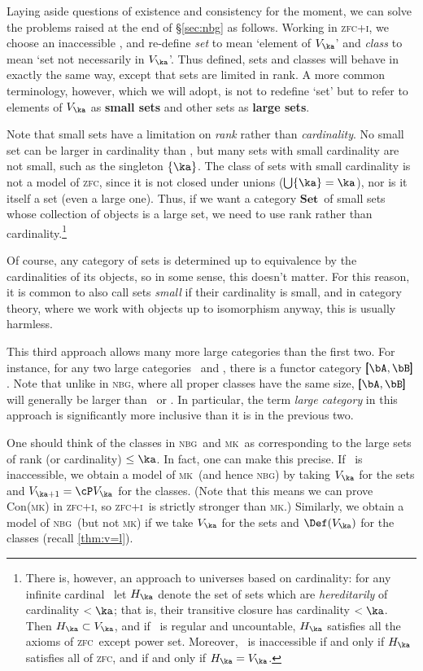 \documentclass[12pt]{amsart}
\newcommand{\Set}{\ensuremath{\mathbf{Set}}}
\def\zfc{\textsc{zfc}}
\def\zfci{\textsc{zfc+i}}
\def\nbg{\textsc{nbg}}
\def\mk{\textsc{mk}}
\begin{document}
Laying aside questions of existence and consistency for the moment, we
can solve the problems raised at the end of \S\ref{sec:nbg} as
follows.  Working in \zfci, we choose an inaccessible \ka, and
re-define \emph{set} to mean `element of $V_\ka$' and \emph{class} to
mean `set not necessarily in $V_\ka$'.  Thus defined, sets and classes
will behave in exactly the same way, except that sets are limited in
rank.  A more common terminology, however, which we will adopt, is not
to redefine `set' but to refer to elements of $V_\ka$ as \textbf{small
  sets} and other sets as \textbf{large sets}.

Note that small sets have a limitation on \emph{rank} rather than
\emph{cardinality}.  No small set can be larger in cardinality than
\ka, but many sets with small cardinality are not small, such as the
singleton $\{\ka\}$.  The class of sets with small cardinality is not
a model of \zfc, since it is not closed under unions ($\bigcup \{\ka\}
= \ka$), nor is it itself a set (even a large one).  Thus, if we want
a category \Set\ of small sets whose collection of objects is a large
set, we need to use rank rather than cardinality.\footnote{There is,
  however, an approach to universes based on cardinality: for any
  infinite cardinal \ka\ let $H_\ka$ denote the set of sets which are
  \emph{hereditarily} of cardinality $<\ka$; that is, their transitive
  closure has cardinality $<\ka$.  Then $H_\ka\subset V_\ka$, and if
  \ka\ is regular and uncountable, $H_\ka$ satisfies all the axioms of
  \zfc\ except power set.  Moreover, \ka\ is inaccessible if and only
  if $H_\ka$ satisfies all of \zfc, and if and only if $H_\ka=V_\ka$.}

Of course, any category of sets is determined up to equivalence by the
cardinalities of its objects, so in some sense, this doesn't matter.
For this reason, it is common to also call sets \emph{small} if their
cardinality is small, and in category theory, where we work with
objects up to isomorphism anyway, this is usually harmless.

This third approach allows many more large categories than the first
two.  For instance, for any two large categories \bA\ and \bB, there
is a functor category $\pmb[\bA,\bB\pmb]$.  Note that unlike in \nbg,
where all proper classes have the same size, $\pmb[\bA,\bB\pmb]$ will
generally be larger than \bA\ or \bB.  In particular, the term
\emph{large category} in this approach is significantly more inclusive
than it is in the previous two.

One should think of the classes in \nbg\ and \mk\ as corresponding to
the large sets of rank (or cardinality) $\le \ka$.  In fact, one can
make this precise.  If \ka\ is inaccessible, we obtain a model of \mk\
(and hence \nbg) by taking $V_\ka$ for the sets and $V_{\ka+1} = \cP
V_\ka$ for the classes.  (Note that this means we can prove Con(\mk)
in \zfci, so \zfci\ is strictly stronger than \mk.)  Similarly, we
obtain a model of \nbg\ (but not \mk) if we take $V_\ka$ for the sets
and $\Def(V_{\ka})$ for the classes (recall \autoref{thm:v=l}).
\end{document}
